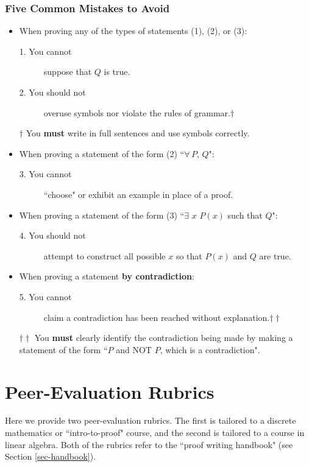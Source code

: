 \documentclass[12pt]{book}
\begin{document}
\subsubsection*{Five Common Mistakes to Avoid}
\begin{itemize}
\item When proving any of the types of statements (1), (2), or (3):
\begin{description}
	\item[1. You cannot] suppose that $Q$ is true.
	\item[2. You should not] overuse symbols nor violate the rules of grammar.$\dagger$
\end{description}

$\dagger$ You \textbf{must} write in full sentences and use symbols correctly.


\item When proving a statement of the form (2) ``$\forall\, P$, $Q$":
\begin{description}
	\item[3. You cannot] ``choose" or exhibit an example in place of a proof.
\end{description}

\item When proving a statement of the form (3) ``$\exists$ $x$ $P(x)$ such that $Q$":
\begin{description}
	\item[4. You should not] attempt to construct all possible $x$ so that $P(x)$ and $Q$ are true. 
\end{description}

\item When proving a statement \textbf{by contradiction}:
\begin{description}
	\item[5. You cannot] claim a contradiction has been reached without explanation.$\dagger\dagger$	
\end{description}

$\dagger\dagger$ You \textbf{must} clearly identify the contradiction being made by making a statement of the form ``$P$ and NOT $P$, which is a contradiction".
\end{itemize}

\clearpage
\section{Peer-Evaluation Rubrics}\label{sec-peer}
Here we provide two peer-evaluation rubrics.  The first is tailored to a discrete mathematics or ``intro-to-proof" course, and the second is tailored to a course in linear algebra.   Both of the rubrics refer to the ``proof writing handbook" (see Section \ref{sec-handbook}).
\clearpage
\end{document}
